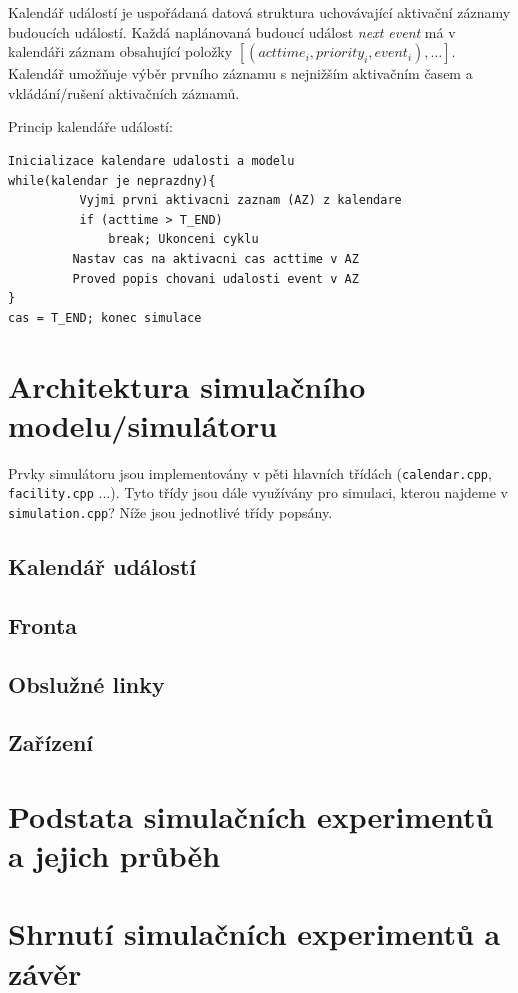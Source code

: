 \documentclass[12pt,a4paper,titlepage,final]{article}
\begin{document}
Kalendář událostí je uspořádaná datová struktura uchovávající aktivační záznamy budoucích událostí. Každá naplánovaná budoucí událost \emph{next event} má v kalendáři záznam obsahující položky $[(acttime_{i}, priority_{i}, event_{i}), \dots]$. Kalendář umožňuje výběr prvního záznamu s nejnižším aktivačním časem a vkládání/rušení aktivačních záznamů.

Princip kalendáře událostí:
\begin{lstlisting}
Inicializace kalendare udalosti a modelu
while(kalendar je neprazdny){
          Vyjmi prvni aktivacni zaznam (AZ) z kalendare
          if (acttime > T_END)
              break; Ukonceni cyklu
         Nastav cas na aktivacni cas acttime v AZ
         Proved popis chovani udalosti event v AZ
}
cas = T_END; konec simulace
\end{lstlisting}

\section{Architektura simulačního modelu/simulátoru}

Prvky simulátoru jsou implementovány v pěti hlavních třídách (\texttt{calendar.cpp}, \texttt{facility.cpp} ...). Tyto třídy jsou dále využívány pro simulaci, kterou najdeme v \texttt{simulation.cpp}? Níže jsou jednotlivé třídy popsány.

\subsection{Kalendář událostí}
\subsection{Fronta}
\subsection{Obslužné linky}
\subsection{Zařízení} 

\section{Podstata simulačních experimentů a jejich průběh}
\section{Shrnutí simulačních experimentů a závěr}
\end{document}
